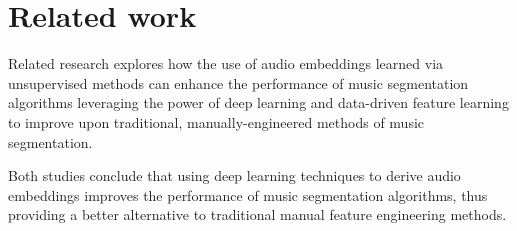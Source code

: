 \section{Related work}

Related research \cite{deepfeaturesegment, SalamonDeepSegmentation} explores how the use of audio embeddings learned via unsupervised methods can enhance the performance of music segmentation algorithms leveraging the power of deep learning and data-driven feature learning to improve upon traditional, manually-engineered methods of music segmentation. 

Both studies conclude that using deep learning techniques to derive audio embeddings improves the performance of music segmentation algorithms, thus providing a better alternative to traditional manual feature engineering methods.

